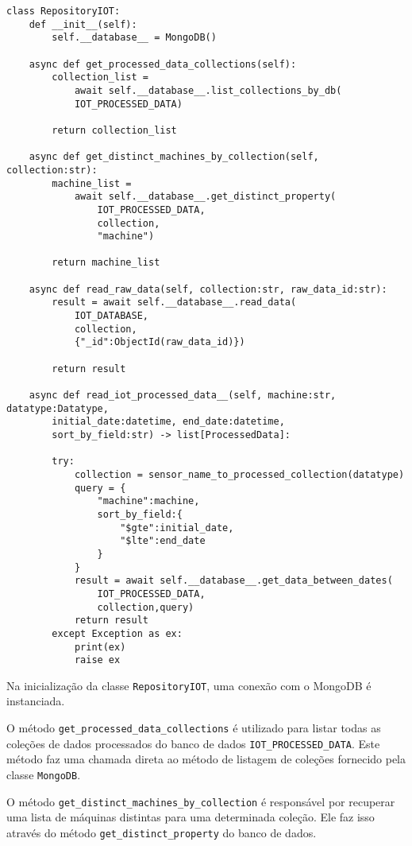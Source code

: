 \begin{verbatim}
class RepositoryIOT:
    def __init__(self):
        self.__database__ = MongoDB()
    
    async def get_processed_data_collections(self):
        collection_list = 
            await self.__database__.list_collections_by_db(
            IOT_PROCESSED_DATA)
    
        return collection_list
        
    async def get_distinct_machines_by_collection(self, collection:str):
        machine_list = 
            await self.__database__.get_distinct_property(
                IOT_PROCESSED_DATA,
                collection,
                "machine")

        return machine_list
    
    async def read_raw_data(self, collection:str, raw_data_id:str):
        result = await self.__database__.read_data(
            IOT_DATABASE,
            collection,
            {"_id":ObjectId(raw_data_id)})

        return result
    
    async def read_iot_processed_data__(self, machine:str, datatype:Datatype, 
        initial_date:datetime, end_date:datetime, 
        sort_by_field:str) -> list[ProcessedData]:
        
        try:
            collection = sensor_name_to_processed_collection(datatype)
            query = {
                "machine":machine,
                sort_by_field:{
                    "$gte":initial_date,
                    "$lte":end_date
                }
            }
            result = await self.__database__.get_data_between_dates(
                IOT_PROCESSED_DATA,
                collection,query)
            return result
        except Exception as ex:
            print(ex)
            raise ex
\end{verbatim}

Na inicialização da classe \texttt{RepositoryIOT}, uma conexão com o MongoDB é instanciada.

O método \texttt{get\_processed\_data\_collections} é utilizado para listar todas as coleções de dados processados do banco de dados \texttt{IOT\_PROCESSED\_DATA}. Este método faz uma chamada direta ao método de listagem de coleções fornecido pela classe \texttt{MongoDB}.

O método \texttt{get\_distinct\_machines\_by\_collection} é responsável por recuperar uma lista de máquinas distintas para uma determinada coleção. Ele faz isso através do método \texttt{get\_distinct\_property} do banco de dados.

